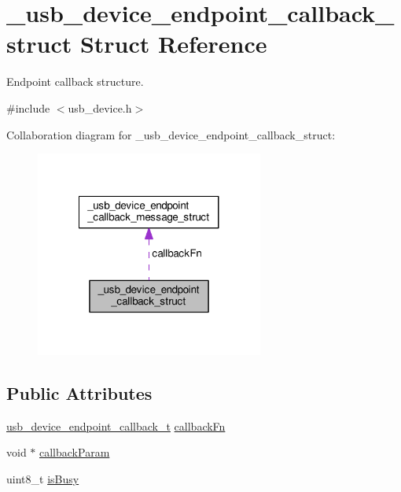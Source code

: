 \hypertarget{struct__usb__device__endpoint__callback__struct}{\section{\-\_\-usb\-\_\-device\-\_\-endpoint\-\_\-callback\-\_\-struct Struct Reference}
\label{struct__usb__device__endpoint__callback__struct}
}


Endpoint callback structure.  




{\ttfamily \#include $<$usb\-\_\-device.\-h$>$}



Collaboration diagram for \-\_\-usb\-\_\-device\-\_\-endpoint\-\_\-callback\-\_\-struct\-:
\nopagebreak
\begin{figure}[H]
\begin{center}
\leavevmode
\includegraphics[width=212pt]{struct__usb__device__endpoint__callback__struct__coll__graph}
\end{center}
\end{figure}
\subsection*{Public Attributes}
\begin{DoxyCompactItemize}
\item 
\hyperlink{group__usb__device__driver_gac780580992587eb809d445edcba7c3ca}{usb\-\_\-device\-\_\-endpoint\-\_\-callback\-\_\-t} \hyperlink{struct__usb__device__endpoint__callback__struct_a9114dcbee3570dec5183be652ae42f8c}{callback\-Fn}
\item 
void $\ast$ \hyperlink{struct__usb__device__endpoint__callback__struct_a40161b7e8305ba255c00567492ad9b3e}{callback\-Param}
\item 
uint8\-\_\-t \hyperlink{struct__usb__device__endpoint__callback__struct_afa1b230c2518235fd2b5838ddee9b79d}{is\-Busy}
\end{DoxyCompactItemize}


